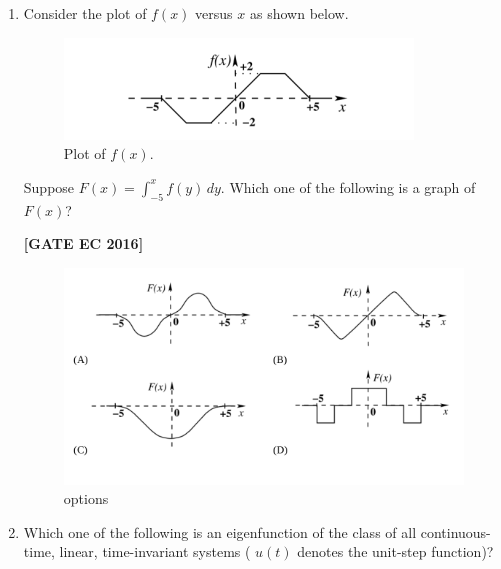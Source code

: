 \documentclass[12pt]{article}
\begin{document}
\begin{enumerate}[label=\textbf{Q.\arabic*.}, start=6, itemsep=2em]
\begin{enumerate}[label=\textbf{Q.\arabic*.}]
\noindent \textbf{[GATE EC 2016]}

\begin{multicols}{2}
\begin{enumerate}[label=\alph*.]
    \item The solutions have neither maxima nor minima anywhere except at the boundaries.
    \item The solutions are not separable in the coordinates.
    \item The solutions are not continuous.
    \item The solutions are not dependent on the boundary conditions.
\end{enumerate}
\end{multicols}

\item Consider the plot of $f(x)$ versus $x$ as shown below.

\begin{figure}[H]\centering
    \includegraphics[width=0.6\columnwidth]{figs/q5.png}
    \caption{Plot of $f(x)$.}
    \label{fig:q5}
\end{figure}

Suppose $F(x)=\displaystyle\int_{-5}^{x} f(y)\,dy$. Which one of the following is a graph of $F(x)$?

\noindent \textbf{[GATE EC 2016]}

\begin{figure}[H]\centering
    \includegraphics[width=0.6\columnwidth]{figs/q5o.png}
    \caption{options}
    \label{fig:q5o}
\end{figure}

\item Which one of the following is an eigenfunction of the class of all continuous-time, linear, time-invariant systems ( $u(t)$ denotes the unit-step function)?


\end{enumerate}
\end{enumerate}
\end{document}
